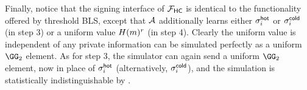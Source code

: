 Finally, notice that the signing interface of $\mathcal{F}_\mathsf{HC}$ is identical to the functionality offered by threshold BLS, except that $\mathcal{A}$ additionally learns either $\sigma_i^{\mathsf{hot}}$ or $\sigma_i^{\mathsf{cold}}$ (in step 3) or a uniform value $H(m)^r$ (in step 4). Clearly the uniform value is independent of any private information can be simulated perfectly as a uniform $\GG_2$ element. As for step 3, the simulator can again send a uniform $\GG_2$ element, now in place of $\sigma_i^{\mathsf{hot}}$ (alternatively, $\sigma_i^{\mathsf{cold}}$), and the simulation is statistically indistinguishable by .
